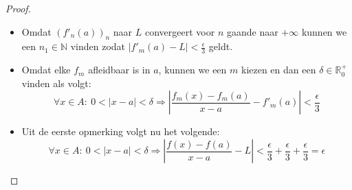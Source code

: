\documentclass[main.tex]{subfiles}
\begin{document}
\begin{st}
\begin{proof}
\begin{itemize}
    \item Omdat $\left(f'_{n}(a)\right)_{n}$ naar $L$ convergeert voor $n$ gaande naar $+\infty$ kunnen we een $n_{1}\in \mathbb{N}$ vinden zodat $|f'_{m}(a)-L|<\frac{\epsilon}{3}$ geldt.
    \item Omdat elke $f_{m}$ afleidbaar is in $a$, kunnen we een $m$ kiezen en dan een $\delta \in \mathbb{R}_{0}^{+}$ vinden als volgt:
      \[ \forall x\in A:\ 0 < |x-a| < \delta \Rightarrow \left| \frac{f_{m}(x)-f_{m}(a)}{x-a}-f'_{m}(a) \right| < \frac{\epsilon}{3} \]
    \item Uit de eerste opmerking volgt nu het volgende:
      \[ \forall x\in A:\ 0 < |x-a| < \delta \Rightarrow \left|\frac{f(x)-f(a)}{x-a}-L\right| < \frac{\epsilon}{3} + \frac{\epsilon}{3}  + \frac{\epsilon}{3} = \epsilon \]
    \end{itemize}
  \end{proof}
\end{st}
\end{document}

